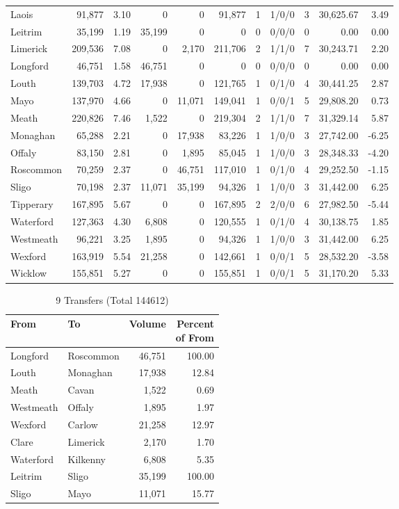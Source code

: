 \documentclass[a4paper]{article}
\begin{document}
\begin{longtable}{lrrrrrrlrrr}
Laois&91,877& 3.10&0&0&91,877&1&1/0/0&3&30,625.67& 3.49\\ 
Leitrim&35,199& 1.19&35,199&0&0&0&0/0/0&0& 0.00& 0.00\\ 
Limerick&209,536& 7.08&0&2,170&211,706&2&1/1/0&7&30,243.71& 2.20\\ 
Longford&46,751& 1.58&46,751&0&0&0&0/0/0&0& 0.00& 0.00\\ 
Louth&139,703& 4.72&17,938&0&121,765&1&0/1/0&4&30,441.25& 2.87\\ 
Mayo&137,970& 4.66&0&11,071&149,041&1&0/0/1&5&29,808.20& 0.73\\ 
Meath&220,826& 7.46&1,522&0&219,304&2&1/1/0&7&31,329.14& 5.87\\ 
Monaghan&65,288& 2.21&0&17,938&83,226&1&1/0/0&3&27,742.00&-6.25\\ 
Offaly&83,150& 2.81&0&1,895&85,045&1&1/0/0&3&28,348.33&-4.20\\ 
Roscommon&70,259& 2.37&0&46,751&117,010&1&0/1/0&4&29,252.50&-1.15\\ 
Sligo&70,198& 2.37&11,071&35,199&94,326&1&1/0/0&3&31,442.00& 6.25\\ 
Tipperary&167,895& 5.67&0&0&167,895&2&2/0/0&6&27,982.50&-5.44\\ 
Waterford&127,363& 4.30&6,808&0&120,555&1&0/1/0&4&30,138.75& 1.85\\ 
Westmeath&96,221& 3.25&1,895&0&94,326&1&1/0/0&3&31,442.00& 6.25\\ 
Wexford&163,919& 5.54&21,258&0&142,661&1&0/0/1&5&28,532.20&-3.58\\ 
Wicklow&155,851& 5.27&0&0&155,851&1&0/0/1&5&31,170.20& 5.33\\ 
\end{longtable}

\begin{table}[htbp]
\caption{9 Transfers (Total 144612)}
\centering
\begin{tabular}{llrr} \toprule
From &To &Volume &\shortstack{Percent\\of From} \\ \midrule
Longford&Roscommon&46,751&100.00\\ 
Louth&Monaghan&17,938&12.84\\ 
Meath&Cavan&1,522& 0.69\\ 
Westmeath&Offaly&1,895& 1.97\\ 
Wexford&Carlow&21,258&12.97\\ 
Clare&Limerick&2,170& 1.70\\ 
Waterford&Kilkenny&6,808& 5.35\\ 
Leitrim&Sligo&35,199&100.00\\ 
Sligo&Mayo&11,071&15.77\\ 
\bottomrule
\end{tabular}
\end{table}
\end{document}
